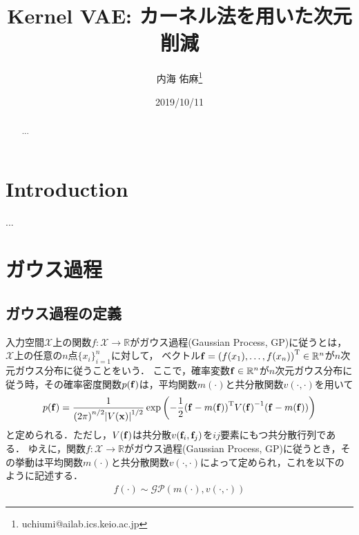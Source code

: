 \documentclass[11pt,a4j]{article}
\title{Kernel VAE: カーネル法を用いた次元削減}
\date{2019/10/11}
\author[1]{内海 佑麻\thanks{uchiumi@ailab.ics.keio.ac.jp}}
\affil[1]{慶應義塾大学理工学部情報工学科}
\begin{document}
  \maketitle
  
  \begin{abstract}
    ...
  \end{abstract}

  \tableofcontents

  \section{Introduction}
    ...
  \section{ガウス過程}
    \subsection{ガウス過程の定義}
      入力空間$\mathcal{X}$上の関数$f: \mathcal{X} \to \mathbb{R}$がガウス過程(Gaussian Process, GP)に従うとは，$\mathcal{X}$上の任意の$n$点${ \{ x_i \} }_{i=1}^{n}$に対して，
      ベクトル${\bf f} = { ( f(x_1),\dots,f(x_n) ) }^{\mathrm{T}} \in \mathbb{R}^{n}$が$n$次元ガウス分布に従うことをいう．
      ここで，確率変数${\bf f} \in \mathbb{R}^{n}$が$n$次元ガウス分布に従う時，その確率密度関数$p({\bf f})$は，平均関数${m}(\cdot)$と共分散関数$v(\cdot,\cdot)$を用いて
      \begin{align}
        p({\bf f}) = \frac{1}{ {(2 \pi)}^{n/2} {| V({\bf x}) |}^{1/2} } \exp \left( {- \frac{1}{2}} {({\bf f} - m(\bf f))}^{\mathrm{T}} {V({\bf f})}^{-1} ({\bf f} - m(\bf f)) \right)
      \end{align}
      と定められる．ただし，$V({\bf f})$は共分散$v({\bf f}_i, {\bf f}_j)$を$ij$要素にもつ共分散行列である．
      ゆえに，関数$f: \mathcal{X} \to \mathbb{R}$がガウス過程(Gaussian Process, GP)に従うとき，その挙動は平均関数${m}(\cdot)$と共分散関数$v(\cdot,\cdot)$によって定められ，これを以下のように記述する．
      \begin{align}
        f(\cdot) \sim \mathcal{GP}(m(\cdot), v(\cdot,\cdot))
      \end{align}
\end{document}
